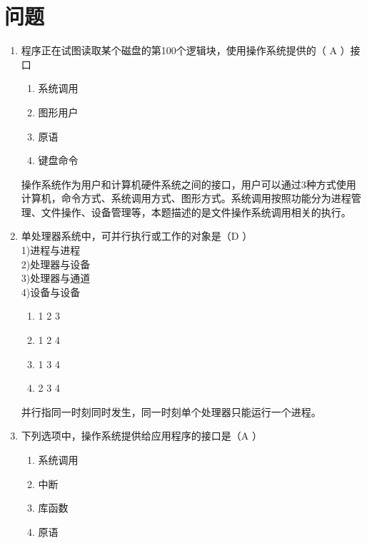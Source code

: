 \section{问题}
\begin{enumerate}
	\item 程序正在试图读取某个磁盘的第100个逻辑块，使用操作系统提供的（ A ）接口
	\begin{enumerate}[A]
		\item 系统调用
		\item 图形用户
		\item 原语
		\item 键盘命令
	\end{enumerate}
操作系统作为用户和计算机硬件系统之间的接口，用户可以通过3种方式使用计算机，命令方式、系统调用方式、图形方式。系统调用按照功能分为进程管理、文件操作、设备管理等，本题描述的是文件操作系统调用相关的执行。
\item 单处理器系统中，可并行执行或工作的对象是（D ）\\
1)进程与进程\\
2)处理器与设备\\
3)处理器与通道\\
4)设备与设备\\
\begin{enumerate}[A]
	\item 1 2 3
	\item 1 2 4
	\item 1 3 4
	\item 2 3 4
\end{enumerate}
并行指同一时刻同时发生，同一时刻单个处理器只能运行一个进程。
\item 下列选项中，操作系统提供给应用程序的接口是（A ）
\begin{enumerate}[A]
	\item 系统调用
	\item 中断
	\item 库函数
	\item 原语
\end{enumerate}


\end{enumerate}
